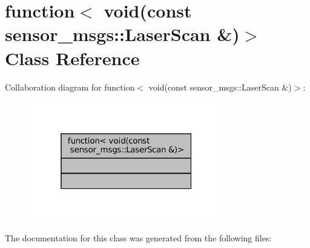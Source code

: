 \hypertarget{classstd_1_1function_3_01void_07const_01sensor__msgs_1_1LaserScan_01_6_08_4}{}\section{function$<$ void(const sensor\+\_\+msgs\+:\+:Laser\+Scan \&)$>$ Class Reference}
\label{classstd_1_1function_3_01void_07const_01sensor__msgs_1_1LaserScan_01_6_08_4}


Collaboration diagram for function$<$ void(const sensor\+\_\+msgs\+:\+:Laser\+Scan \&)$>$\+:
\nopagebreak
\begin{figure}[H]
\begin{center}
\leavevmode
\includegraphics[width=241pt]{classstd_1_1function_3_01void_07const_01sensor__msgs_1_1LaserScan_01_6_08_4__coll__graph}
\end{center}
\end{figure}


The documentation for this class was generated from the following files\+: